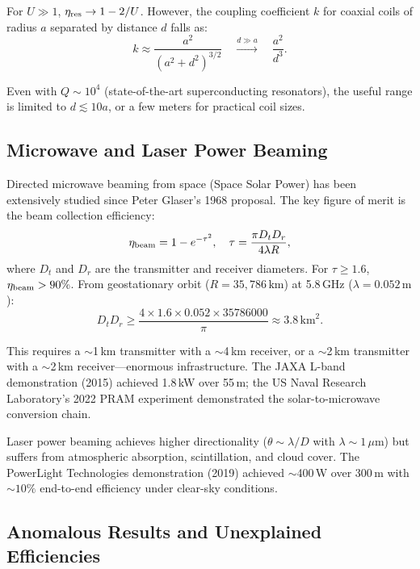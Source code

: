 \documentclass[aps,prd,twocolumn,superscriptaddress,nofootinbib]{revtex4-2}
\begin{document}
For $U \gg 1$, $\eta_{\rm res} \to 1 - 2/U$. However, the coupling
coefficient $k$ for coaxial coils of radius $a$ separated by distance $d$
falls as:
\begin{equation}
k \approx \frac{a^2}{(a^2 + d^2)^{3/2}} \quad \xrightarrow{d \gg a} \quad
\frac{a^2}{d^3}.
\label{eq:coupling_coeff}
\end{equation}

Even with $Q \sim 10^4$ (state-of-the-art superconducting resonators),
the useful range is limited to $d \lesssim 10a$, or a few meters for
practical coil sizes.

\subsection{Microwave and Laser Power Beaming}

Directed microwave beaming from space (Space Solar Power) has been
extensively studied since Peter Glaser's 1968 proposal. The key
figure of merit is the beam collection efficiency:
\begin{equation}
\eta_{\rm beam} = 1 - e^{-\tau^2}, \quad
\tau = \frac{\pi D_t D_r}{4\lambda R},
\label{eq:beam_collection}
\end{equation}
where $D_t$ and $D_r$ are the transmitter and receiver diameters.
For $\tau \geq 1.6$, $\eta_{\rm beam} > 90\%$. From geostationary
orbit ($R = 35{,}786\,\text{km}$) at 5.8\,GHz ($\lambda = 0.052\,\text{m}$):
\begin{equation}
D_t D_r \geq \frac{4 \times 1.6 \times 0.052 \times 35786000}{\pi}
\approx 3.8\,\text{km}^2.
\end{equation}

This requires a $\sim$1\,km transmitter with a $\sim$4\,km receiver, or
a $\sim$2\,km transmitter with a $\sim$2\,km receiver---enormous
infrastructure. The JAXA L-band demonstration (2015) achieved 1.8\,kW
over 55\,m; the US Naval Research Laboratory's 2022 PRAM experiment
demonstrated the solar-to-microwave conversion chain.

Laser power beaming achieves higher directionality ($\theta \sim \lambda/D$
with $\lambda \sim 1\,\mu$m) but suffers from atmospheric absorption,
scintillation, and cloud cover. The PowerLight Technologies
demonstration (2019) achieved $\sim$400\,W over 300\,m with
$\sim10\%$ end-to-end efficiency under clear-sky conditions.

\subsection{Anomalous Results and Unexplained Efficiencies}
\end{document}
